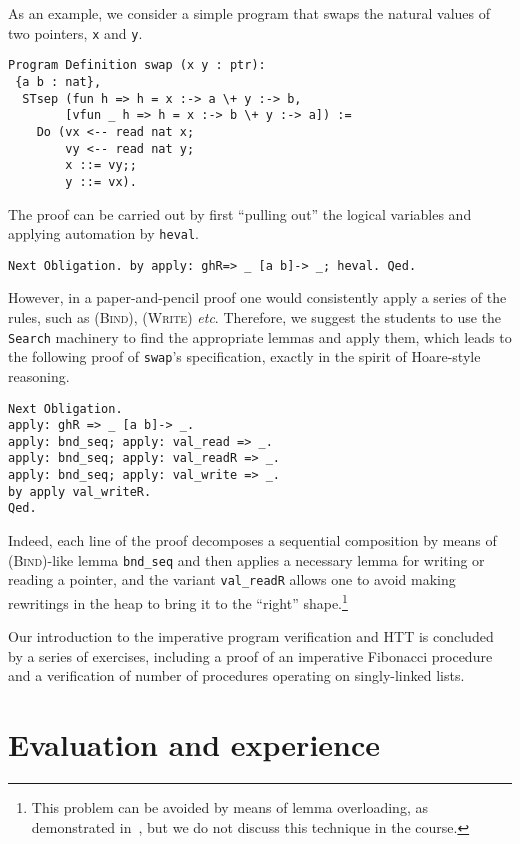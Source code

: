 \documentclass[blockstyle,preprint]{sigplanconf}
\newcommand{\an}[1]{\textcolor{red}{(Aleks: {#1})}}
\newcommand{\code}[1]{\lstinline{#1}}
\newcommand{\etc}{\emph{etc}}
\begin{document}
As an example, we consider a simple program that swaps the natural
values of two pointers, \code{x} and \code{y}.
%
\begin{lstlisting}
Program Definition swap (x y : ptr):
 {a b : nat},
  STsep (fun h => h = x :-> a \+ y :-> b,
        [vfun _ h => h = x :-> b \+ y :-> a]) :=
    Do (vx <-- read nat x;
        vy <-- read nat y;
        x ::= vy;;
        y ::= vx).
\end{lstlisting}
%
The proof can be carried out by first ``pulling out'' the logical
variables and applying automation by \code{heval}.
%
\begin{lstlisting}
Next Obligation. by apply: ghR=> _ [a b]-> _; heval. Qed.
\end{lstlisting}
%
However, in a paper-and-pencil proof one would consistently apply a
series of the rules, such as \textsc{(Bind)}, \textsc{(Write)}
\etc. Therefore, we suggest the students to use the \code{Search}
machinery to find the appropriate lemmas and apply them, which leads
to the following proof of \code{swap}'s specification, exactly in the
spirit of Hoare-style reasoning.
%
\begin{lstlisting}
Next Obligation.
apply: ghR => _ [a b]-> _.
apply: bnd_seq; apply: val_read => _.
apply: bnd_seq; apply: val_readR => _.
apply: bnd_seq; apply: val_write => _.
by apply val_writeR.
Qed.
\end{lstlisting}
%
Indeed, each line of the proof decomposes a sequential composition by
means of \textsc{(Bind)}-like lemma \code{bnd_seq} and then applies a
necessary lemma for writing or reading a pointer, and the variant
\code{val_readR} allows one to avoid making rewritings in the heap to
bring it to the ``right'' shape.\footnote{This problem can be avoided
  by means of lemma overloading, as demonstrated
  in~\cite{Gonthier-al:JFP13}, but we do not discuss this technique
  in the course.}  
%

Our introduction to the imperative program verification and HTT is
concluded by a series of exercises, including a proof of an imperative
Fibonacci procedure and a verification of number of procedures
operating on singly-linked lists.


\section{Evaluation and experience}
\label{sec:eval-exper}
\end{document}
